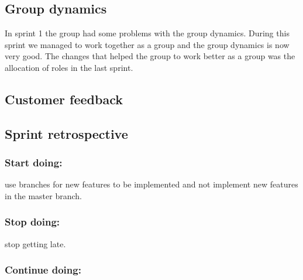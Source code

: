 \subsection{Group dynamics}
	In sprint 1 the group had some problems with the group dynamics. 
	During this sprint we managed to work together as a group and the group dynamics
	is now very good. The changes that helped the group to work better as a group
	was the allocation of roles in the last sprint. 

\subsection{Customer feedback}


\subsection{Sprint retrospective}
	\subsubsection*{Start doing: } use branches for new features to be implemented
	and not implement new features in the master branch.
	\subsubsection*{Stop doing: } stop getting late.
	\subsubsection*{Continue doing: }

